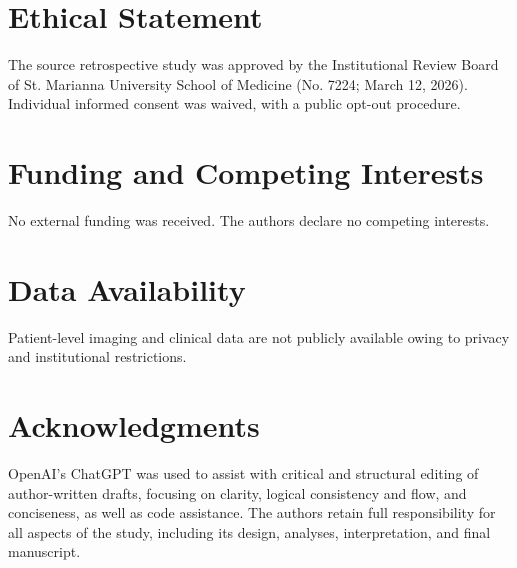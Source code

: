 \documentclass[letterpaper]{article}
\begin{document}
\section*{Ethical Statement}

The source retrospective study was approved by the Institutional Review Board of St. Marianna University School of Medicine (No. 7224; March 12, 2026). Individual informed consent was waived, with a public opt-out procedure.

\section*{Funding and Competing Interests}

No external funding was received. The authors declare no competing interests.

\section*{Data Availability}

Patient-level imaging and clinical data are not publicly available owing to privacy and institutional restrictions.

\section*{Acknowledgments}
OpenAI's ChatGPT was used to assist with critical and structural editing of author-written drafts, focusing on clarity, logical consistency and flow, and conciseness, as well as code assistance. The authors retain full responsibility for all aspects of the study, including its design, analyses, interpretation, and final manuscript.


\end{document}
